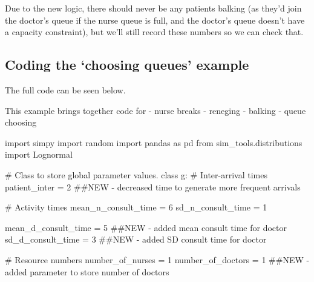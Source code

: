 \documentclass[
  letterpaper,
  DIV=11,
  numbers=noendperiod]{scrreprt}
\newenvironment{Shaded}{\begin{snugshade}}{\end{snugshade}}
\newcommand{\CommentTok}[1]{\textcolor[rgb]{0.37,0.37,0.37}{#1}}
\newcommand{\DecValTok}[1]{\textcolor[rgb]{0.68,0.00,0.00}{#1}}
\newcommand{\ImportTok}[1]{\textcolor[rgb]{0.00,0.46,0.62}{#1}}
\newcommand{\KeywordTok}[1]{\textcolor[rgb]{0.00,0.23,0.31}{#1}}
\newcommand{\NormalTok}[1]{\textcolor[rgb]{0.00,0.23,0.31}{#1}}
\newcommand{\OperatorTok}[1]{\textcolor[rgb]{0.37,0.37,0.37}{#1}}
\begin{document}
Due to the new logic, there should never be any patients balking (as
they'd join the doctor's queue if the nurse queue is full, and the
doctor's queue doesn't have a capacity constraint), but we'll still
record these numbers so we can check that.

\subsection{Coding the `choosing queues'
example}\label{coding-the-choosing-queues-example}

The full code can be seen below.

This example brings together code for - nurse breaks - reneging -
balking - queue choosing

\begin{tcolorbox}[enhanced jigsaw, rightrule=.15mm, colback=white, colframe=quarto-callout-note-color-frame, colbacktitle=quarto-callout-note-color!10!white, toprule=.15mm, coltitle=black, opacityback=0, titlerule=0mm, bottomtitle=1mm, breakable, title=\textcolor{quarto-callout-note-color}{\faInfo}\hspace{0.5em}{Note}, opacitybacktitle=0.6, toptitle=1mm, arc=.35mm, bottomrule=.15mm, leftrule=.75mm, left=2mm]

\begin{Shaded}
\begin{Highlighting}[]
\ImportTok{import}\NormalTok{ simpy}
\ImportTok{import}\NormalTok{ random}
\ImportTok{import}\NormalTok{ pandas }\ImportTok{as}\NormalTok{ pd}
\ImportTok{from}\NormalTok{ sim\_tools.distributions }\ImportTok{import}\NormalTok{ Lognormal}

\CommentTok{\# Class to store global parameter values.}
\KeywordTok{class}\NormalTok{ g:}
    \CommentTok{\# Inter{-}arrival times}
\NormalTok{    patient\_inter }\OperatorTok{=} \DecValTok{2} \CommentTok{\#\#NEW {-} decreased time to generate more frequent arrivals}

    \CommentTok{\# Activity times}
\NormalTok{    mean\_n\_consult\_time }\OperatorTok{=} \DecValTok{6}
\NormalTok{    sd\_n\_consult\_time }\OperatorTok{=} \DecValTok{1}

\NormalTok{    mean\_d\_consult\_time }\OperatorTok{=} \DecValTok{5} \CommentTok{\#\#NEW {-} added mean consult time for doctor}
\NormalTok{    sd\_d\_consult\_time }\OperatorTok{=} \DecValTok{3} \CommentTok{\#\#NEW {-} added SD consult time for doctor}

    \CommentTok{\# Resource numbers}
\NormalTok{    number\_of\_nurses }\OperatorTok{=} \DecValTok{1}
\NormalTok{    number\_of\_doctors }\OperatorTok{=} \DecValTok{1} \CommentTok{\#\#NEW {-} added parameter to store number of doctors}


\end{Highlighting}
\end{Shaded}
\end{tcolorbox}
\end{document}
